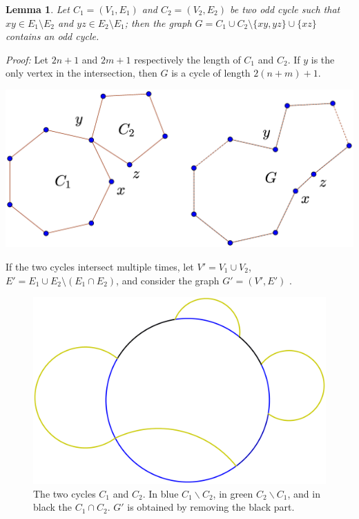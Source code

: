 \documentclass[a4paper,12pt,oneside]{book}
\newtheorem{lemma}[theorem]{Lemma}
\begin{document}
\vspace*{-0.1cm}
\begin{lemma}\label{tech-lemma-graph}
Let $C_1=(V_1,E_1)$ and $C_2=(V_2,E_2)$ be two odd cycle such that $xy\in E_1\setminus E_2$ and 
$yz\in E_2\setminus E_1$;  then the graph $G=C_1\cup C_2\setminus\{xy,yz\}\cup\{xz\}$ contains an odd cycle.
\end{lemma}\textit{Proof: }Let $2n+1$ and $2m+1$ respectively the length of $C_1$ and $C_2$. If $y$ is the only vertex in the intersection, then  $G$ is a cycle of length $2(n+m)+1$. 
\vspace*{-0.1cm}
\begin{center}
\includegraphics[scale=0.2]{oddcycles1.eps}
\end{center}


\newpage\noindent
If the two cycles intersect multiple times, let $V'=V_1\cup V_2$, $E'=E_1\cup E_2\setminus (E_1\cap E_2)$, and consider the graph $G'=(V',E')$ .

\begin{figure}[h]
\centering
\includegraphics[scale=0.11]{oddcycles-interceptions.eps}
\caption{The two cycles $C_1$ and $C_2$. In blue $C_1 \backslash C_2 $, in green $C_2\backslash C_1 $, and in black the $C_1\cap C_2$. $G'$ is obtained by removing the black part.} 
\end{figure}
\end{document}
